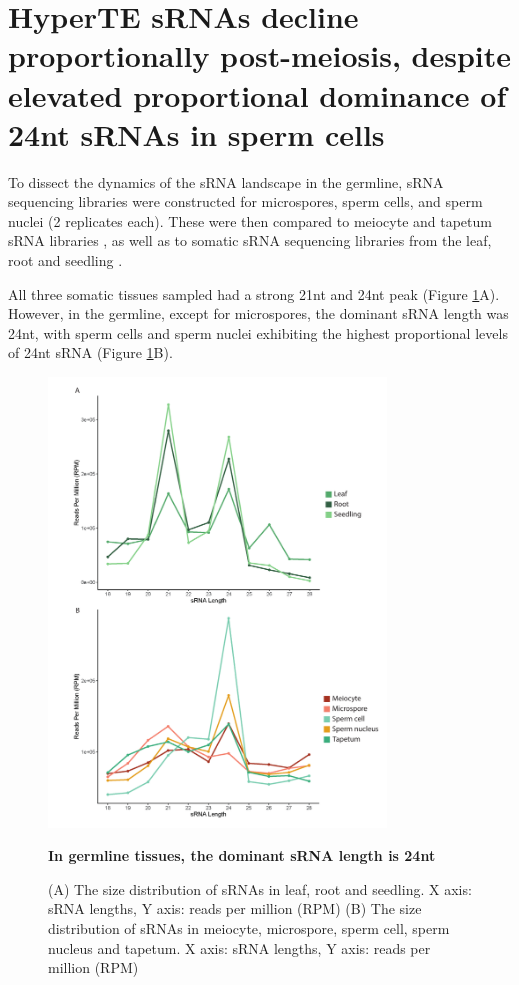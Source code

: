 \section{HyperTE sRNAs decline proportionally post-meiosis, despite elevated proportional dominance of 24nt sRNAs in sperm cells}

To dissect the dynamics of the sRNA landscape in the germline, sRNA sequencing libraries were constructed for microspores, sperm cells, and sperm nuclei (2 replicates each). These were then compared to meiocyte and tapetum sRNA libraries \citep{RN187}, as well as to somatic sRNA sequencing libraries from the leaf, root and seedling \citep{RN262,RN263,RN264}. 

All three somatic tissues sampled had a strong 21nt and 24nt peak (Figure \ref{fig:sRNA_sizes}A). However, in the germline, except for microspores, the dominant sRNA length was 24nt, with sperm cells and sperm nuclei exhibiting the highest proportional levels of 24nt sRNA (Figure \ref{fig:sRNA_sizes}B).

\begin{figure}[htbp!] 
\centering    
    \includegraphics[width=0.8\textwidth]{Chapter2/Figs/Figure6_sRNA_sizes.pdf}
\caption{\textbf{In germline tissues, the dominant sRNA length is 24nt}}
\label{fig:sRNA_sizes}
\captionsetup{font=small}
    \caption*{(A) The size distribution of sRNAs in leaf, root and seedling. X axis: sRNA lengths, Y axis: reads per million (RPM) (B) The size distribution of sRNAs in meiocyte, microspore, sperm cell, sperm nucleus and tapetum. X axis: sRNA lengths, Y axis: reads per million (RPM)}
\end{figure}

